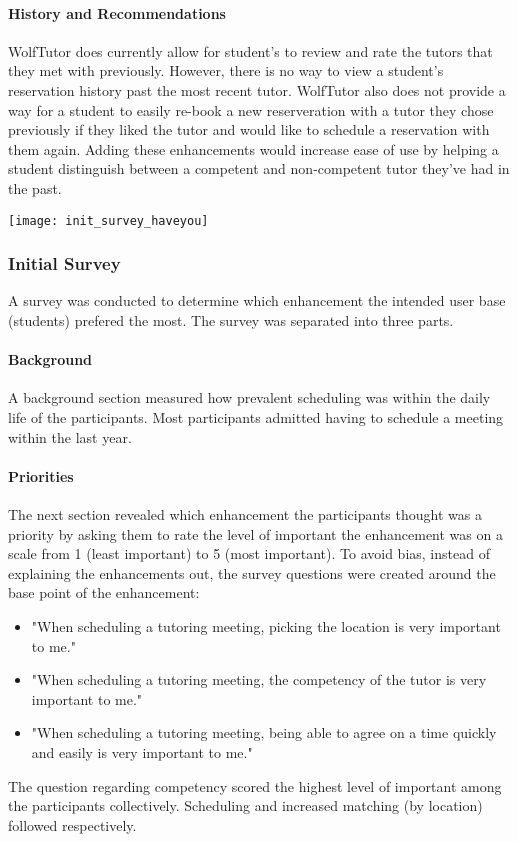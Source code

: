 \paragraph{History and Recommendations} WolfTutor does currently allow
for student's to review and rate the tutors that they met with
previously. However, there is no way to view a student's reservation
history past the most recent tutor. WolfTutor also does not provide a
way for a student to easily re-book a new reserveration with a tutor
they chose previously if they liked the tutor and would like to
schedule a reservation with them again. Adding these enhancements
would increase ease of use by helping a student distinguish between a
competent and non-competent tutor they've had in the past.

\begin{figure*}[t]
  \centering
    \texttt{[image: init\_survey\_haveyou]}
    \label{fig:scatterplot}
\end{figure*}

\subsubsection{Initial Survey}
\label{sec:initial-survey} A survey was conducted to determine which
enhancement the intended user base (students) prefered the most. The
survey was separated into three parts.

\paragraph{Background} A background section measured how prevalent
scheduling was within the daily life of the participants. Most
participants admitted having to schedule a meeting within the last
year.

\paragraph{Priorities} The next section revealed which enhancement the
participants thought was a priority by asking them to rate the level
of important the enhancement was on a scale from 1 (least important)
to 5 (most important). To avoid bias, instead of explaining the
enhancements out, the survey questions were created around the base
point of the enhancement:
\begin{itemize}
  \item "When scheduling a tutoring meeting, picking the location is
very important to me."
  \item "When scheduling a tutoring meeting, the competency of the
tutor is very important to me."
  \item "When scheduling a tutoring meeting, being able to agree on a
time quickly and easily is very important to me."
\end{itemize} The question regarding competency scored the highest
level of important among the participants collectively. Scheduling and
increased matching (by location) followed respectively.

